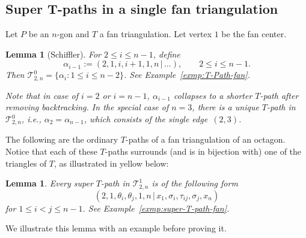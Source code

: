 \documentclass[pdftex]{sigma}
\numberwithin{equation}{section}
\newtheorem{Lemma}[Theorem]{Lemma}
\begin{document}
\subsection[Super T-paths in a single fan triangulation]{Super $\boldsymbol{T}$-paths in a single fan triangulation}

Let $P$ be an $n$-gon and $T$ a fan triangulation. Let vertex $1$ be the fan center.

\begin{Lemma}[Schiffler] \label{lemma:Schiffler}
	For $2\leq i\leq n-1$, define
	\[\alpha_{i-1}:=(2,1,i,i+1,1,n\,|\,\dots),\qquad2\leqslant i\leqslant n-1.\]
	Then $\mathcal T^0_{2,n}=\{\alpha_i\colon 1\leq i\leq n-2\}$. See Example~{\rm \ref{exmp:T-Path-fan}}.
	
	Note that in case of $i=2$ or $i=n-1$, $\alpha_{i-1}$ collapses to a shorter $T$-path after removing backtracking. In the special case of $n=3$, there is a unique $T$-path in $\mathcal T^0_{2,n}$, i.e., $\alpha_2 = \alpha_{n-1}$, which consists of the single edge~$(2,3)$.
\end{Lemma}

\begin{Example}\label{exmp:T-Path-fan}\rm
	The following are the ordinary $T$-paths of a fan triangulation of an octagon. Notice that each of these $T$-paths surrounds (and is in bijection with) one of the triangles of $T$, as illustrated in yellow below:
\begin{center}

\end{center}
\end{Example}

\begin{Lemma}\label{lm:super-path-single-fan}
	Every super $T$-path in $\mathcal T^1_{2,n}$ is of the following form
	\[(2,1,\theta_i,\theta_j,1,n\,|\,x_1,\sigma_i,\tau_{ij},\sigma_j,x_n)\]
	for $1\leq i<j\leq n-1$. See Example~{\rm \ref{exmp:super-T-path-fan}}.
\end{Lemma}

We illustrate this lemma with an example before proving it.
\end{document}
